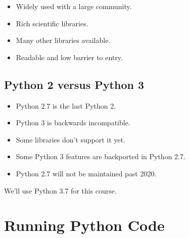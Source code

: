 \documentclass[aspectratio=1610,slidestop]{beamer}
\begin{document}
\begin{pframe}
 \begin{itemize}
  \item Widely used with a large community.
  \item Rich scientific libraries.
  \item Many other libraries available.
  \item Readable and low barrier to entry.
 \end{itemize}
\end{pframe}

\subsection{Python 2 versus Python 3}
\begin{pframe}
 \begin{itemize}
  \item Python 2.7 is the last Python 2.
  \item Python 3 is backwards incompatible.
  \item Some libraries don't support it yet.
  \item Some Python 3 features are backported in Python 2.7.
  \item Python 2.7 will not be maintained past 2020.
 \end{itemize}
  We'll use Python 3.7 for this course.
\end{pframe}


\section{Running Python Code}
\end{document}
